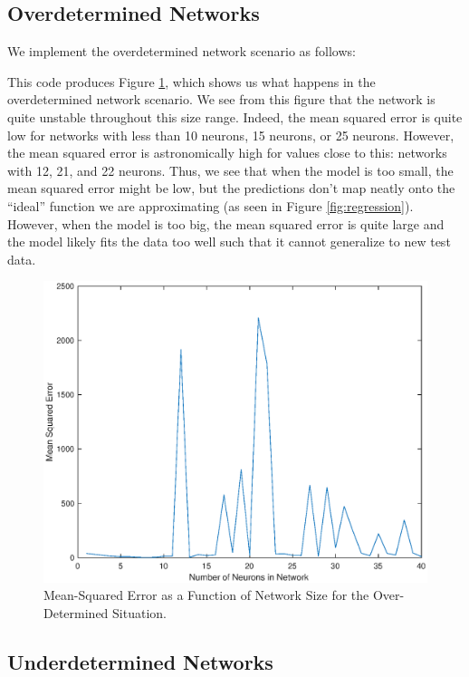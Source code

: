 \documentclass[11pt, oneside]{article}
\begin{document}
\subsection{Overdetermined Networks}

We implement the overdetermined network scenario as follows:

This code produces Figure \ref{fig:overdetermined}, which shows us what happens in the overdetermined network scenario. We see from this figure that the network is quite unstable throughout this size range. Indeed, the mean squared error is quite low for networks with less than 10 neurons, 15 neurons, or 25 neurons. However, the mean squared error is astronomically high for values close to this: networks with 12, 21, and 22 neurons. Thus, we see that when the model is too small, the mean squared error might be low, but the predictions don't map neatly onto the ``ideal'' function we are approximating (as seen in Figure \ref{fig:regression}). However, when the model is too big, the mean squared error is quite large and the model likely fits the data too well such that it cannot generalize to new test data.

\begin{figure}[ht!]
\includegraphics[width=1\textwidth]{Q2PartB.eps}
\caption{Mean-Squared Error as a Function of Network Size for the Over-Determined Situation.}
\label{fig:overdetermined}
\end{figure}

\subsection{Underdetermined Networks}
\end{document}
